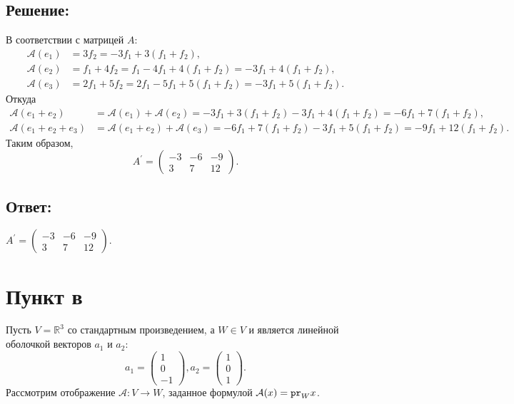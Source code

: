 \documentclass[12pt]{article}
\begin{document}
    \subsection*{Решение:}
    В соответствии с матрицей $A$:
    \begin{align*}
        \mathcal{A}(e_1) &
        = 3 f_2
        = - 3 f_1 + 3 ( f_1 + f_2 ), \\
        \mathcal{A}(e_2) &
        = f_1 + 4 f_2
        = f_1 - 4 f_1 + 4 ( f_1 + f_2 )
        = -3 f_1 + 4 ( f_1 + f_2 ), \\
        \mathcal{A}(e_3) &
        = 2 f_1 + 5 f_2
        = 2 f_1 - 5 f_1 + 5 ( f_1 + f_2 )
        = -3 f_1 + 5 ( f_1 + f_2 ) .
    \end{align*}
    Откуда
    \begin{align*}
        \mathcal{A}(e_1 + e_2) &
        = \mathcal{A}(e_1) + \mathcal{A}(e_2)
        = - 3 f_1 + 3 ( f_1 + f_2 ) - 3 f_1 + 4 ( f_1 + f_2 )
        = - 6 f_1 + 7 ( f_1 + f_2 ), \\
        \mathcal{A}(e_1 + e_2 + e_3) &
        = \mathcal{A}(e_1 + e_2) + \mathcal{A}(e_3)
        = - 6 f_1 + 7 ( f_1 + f_2 ) - 3 f_1 + 5 ( f_1 + f_2 )
        = - 9 f_1 + 12 ( f_1 + f_2 ) .
    \end{align*}
    Таким образом,
    \[
        A^{\prime}
        =
        \begin{pmatrix}
            -3 & -6 & -9 \\
            3  & 7  & 12
        \end{pmatrix}
        .
    \]

    \subsection*{Ответ:}
    $
    A^{\prime}
    =
    \begin{pmatrix}
        -3 & -6 & -9 \\
        3  & 7  & 12
    \end{pmatrix}
    $.

    \section*{Пункт в}
    Пусть $V = \mathbb{R}^3$ со стандартным произведением, а $W \in V$ и является линейной оболочкой векторов $a_1$ и $a_2$:
    \[
        a_1 = \begin{pmatrix}
                  1 \\ 0 \\ -1
        \end{pmatrix},
        a_2 = \begin{pmatrix}
                  1 \\ 0 \\ 1
        \end{pmatrix}
        .
    \]
    Рассмотрим отображение $\mathcal{A}: V \rightarrow W$, заданное формулой $\mathcal{A}(x) = \texttt{pr}_{W} {x}$.
\end{document}
